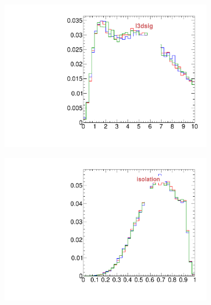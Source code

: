 \begin{figure}
\begin{subfigure}[b]{0.2\textwidth}
                \includegraphics[width=\textwidth]{Figures/VariablesComparison/Data_barrel_figs_3h/l3dsig}
                \label{fig:Data_barrel_l3dsig_3h}
        \end{subfigure}
        \begin{subfigure}[b]{0.2\textwidth}
                \centering
                \includegraphics[width=\textwidth]{Figures/VariablesComparison/Data_barrel_figs_3h/isolation}
                \label{fig:Data_barrel_isolation_3h}
        \end{subfigure}
        \begin{subfigure}[b]{0.2\textwidth}
                \centering

\end{subfigure}
\end{figure}
